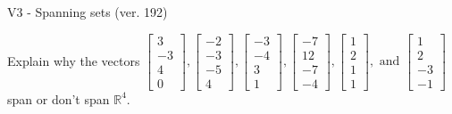 \begin{exercise}
  \begin{exerciseTitle}V3 - Spanning sets (ver. 192)\end{exerciseTitle}
  \begin{exerciseStatement}
    Explain why the vectors \(\left[\begin{array}{r}
3 \\
-3 \\
4 \\
0
\end{array}\right] , \left[\begin{array}{r}
-2 \\
-3 \\
-5 \\
4
\end{array}\right] , \left[\begin{array}{r}
-3 \\
-4 \\
3 \\
1
\end{array}\right] , \left[\begin{array}{r}
-7 \\
12 \\
-7 \\
-4
\end{array}\right] , \left[\begin{array}{r}
1 \\
2 \\
1 \\
1
\end{array}\right] , \text{ and } \left[\begin{array}{r}
1 \\
2 \\
-3 \\
-1
\end{array}\right]\) span or don't span \(\mathbb{R}^4\). 
	



\end{exerciseStatement}
\end{exercise}
